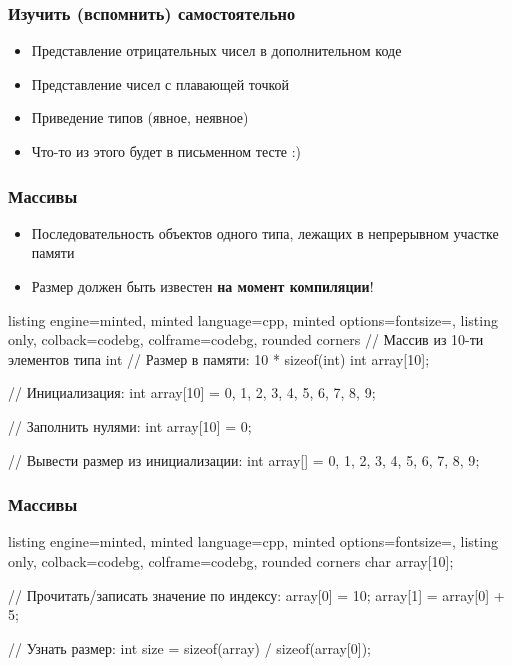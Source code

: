 \documentclass[10pt]{beamer}
\begin{document}
\begin{frame}[fragile]
\frametitle{Изучить (вспомнить) самостоятельно}
\begin{itemize}
\item Представление отрицательных чисел в дополнительном коде
\pause
\item Представление чисел с плавающей точкой
\pause
\item Приведение типов (явное, неявное)
\pause
\item Что-то из этого будет в письменном тесте :)
\end{itemize}
\end{frame}

\begin{frame}[fragile]
\frametitle{Массивы}
\begin{itemize}
\item Последовательность объектов одного типа, лежащих в непрерывном участке памяти
\item Размер должен быть известен \textbf{на момент компиляции}!
\end{itemize}
\begin{tcblisting}{listing engine=minted, minted language=cpp, minted options={fontsize=\scriptsize}, listing only, colback=codebg, colframe=codebg, rounded corners}
// Массив из 10-ти элементов типа int
// Размер в памяти: 10 * sizeof(int)
int array[10];

// Инициализация:
int array[10] = {0, 1, 2, 3, 4, 5, 6, 7, 8, 9};

// Заполнить нулями:
int array[10] = {0};

// Вывести размер из инициализации:
int array[] = {0, 1, 2, 3, 4, 5, 6, 7, 8, 9};
\end{tcblisting}
\end{frame}

\begin{frame}[fragile]
\frametitle{Массивы}
\begin{tcblisting}{listing engine=minted, minted language=cpp, minted options={fontsize=\scriptsize}, listing only, colback=codebg, colframe=codebg, rounded corners}
char array[10];

// Прочитать/записать значение по индексу:
array[0] = 10;
array[1] = array[0] + 5;

// Узнать размер:
int size = sizeof(array) / sizeof(array[0]);
\end{tcblisting}
\end{frame}
\end{document}
